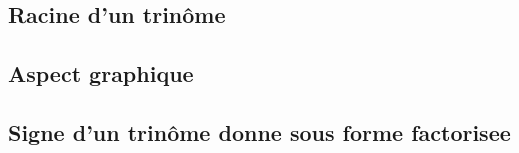 \subsection{Racine d'un trinôme}







\subsection{Aspect graphique}



\subsection{Signe d'un trinôme donne sous forme factorisee}





